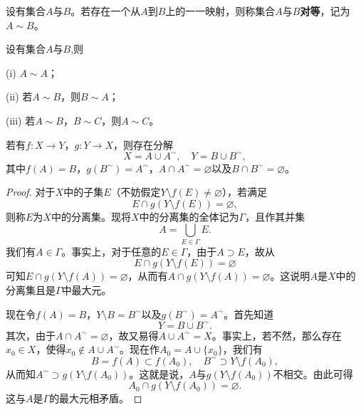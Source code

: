 \documentclass[../../main.tex]{subfiles}
\begin{document}
\begin{definition}[集合之间的对等关系]\label{definition:集合之间的对等关系}
  设有集合\(A\)与\(B\)。若存在一个从\(A\)到\(B\)上的一一映射，则称集合\(A\)与\(B\)\textbf{对等}，记为\(A\sim B\)。
\end{definition}

\begin{proposition}[对等关系的基本性质]\label{proposition:对等关系的基本性质}
设有集合\(A\)与\(B\),则

  (i) \(A\sim A\)；

(ii) 若\(A\sim B\)，则\(B\sim A\)；

(iii) 若\(A\sim B\)，\(B\sim C\)，则\(A\sim C\)。
\end{proposition}

\begin{lemma}[映射分解定理]\label{lemma:映射分解定理}
若有\(f:X\rightarrow Y\)，\(g:Y\rightarrow X\)，则存在分解
\[X = A\cup A^{\sim}, \quad Y = B\cup B^{\sim},\]
其中\(f(A)=B\)，\(g(B^{\sim})=A^{\sim}\)，\(A\cap A^{\sim}=\varnothing\)以及\(B\cap B^{\sim}=\varnothing\)。
\end{lemma}
\begin{proof}
  对于\(X\)中的子集\(E\)（不妨假定\(Y\setminus f(E)\neq\varnothing\)），若满足
\[E\cap g(Y\setminus f(E)) = \varnothing,\]
则称\(E\)为\(X\)中的分离集。现将\(X\)中的分离集的全体记为\(\Gamma\)，且作其并集
\[A = \bigcup_{E\in\Gamma}E.\]
我们有\(A\in\Gamma\)。事实上，对于任意的\(E\in\Gamma\)，由于\(A\supset E\)，故从
\[E\cap g(Y\setminus f(E)) = \varnothing\]
可知\(E\cap g(Y\setminus f(A)) = \varnothing\)，从而有\(A\cap g(Y\setminus f(A)) = \varnothing\)。这说明\(A\)是\(X\)中的分离集且是\(\Gamma\)中最大元。

现在令\(f(A)=B\)，\(Y\setminus B = B^{\sim}\)以及\(g(B^{\sim}) = A^{\sim}\)。首先知道
\[Y = B\cup B^{\sim}.\]
其次，由于\(A\cap A^{\sim} = \varnothing\)，故又易得\(A\cup A^{\sim} = X\)。事实上，若不然，那么存在\(x_0\in X\)，使得\(x_0\notin A\cup A^{\sim}\)。现在作\(A_0 = A\cup\{x_0\}\)，我们有
\[B = f(A)\subset f(A_0), \quad B^{\sim}\supset Y\setminus f(A_0),\]
从而知\(A^{\sim}\supset g(Y\setminus f(A_0))\)。这就是说，\(A\)与\(g(Y\setminus f(A_0))\)不相交。由此可得
\[A_0\cap g(Y\setminus f(A_0)) = \varnothing.\]
这与\(A\)是\(\Gamma\)的最大元相矛盾。

\end{proof}
\end{document}
